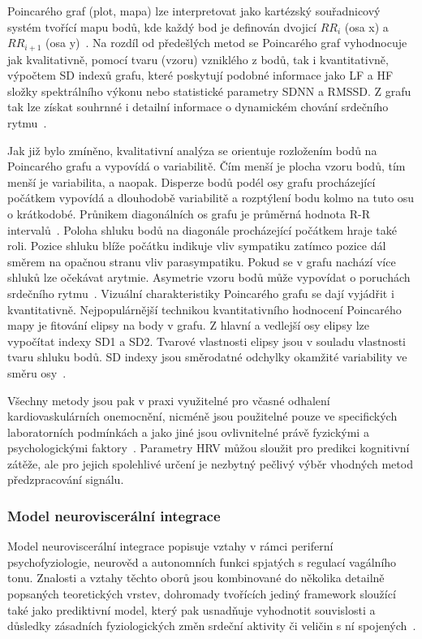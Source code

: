 Poincarého graf (plot, mapa) lze interpretovat jako kartézský souřadnicový systém
tvořící mapu bodů, kde každý bod je definován dvojicí $RR_i$ (osa x) a
$RR_{i+1}$ (osa y)~\cite{Hsu2012,Hejjel2001}. Na rozdíl od předešlých metod se
Poincarého graf vyhodnocuje jak kvalitativně, pomocí tvaru (vzoru) vzniklého z
bodů, tak i kvantitativně, výpočtem SD indexů grafu, které poskytují podobné
informace jako LF a HF složky spektrálního výkonu nebo statistické parametry
SDNN a RMSSD. Z grafu tak lze získat souhrnné i detailní informace o dynamickém
chování srdečního rytmu~\cite{Hsu2012,Kubickova2016}. 

Jak již bylo zmíněno, kvalitativní analýza se orientuje rozložením bodů na
Poincarého grafu a vypovídá o variabilitě. Čím menší je plocha vzoru bodů, tím
menší je variabilita, a naopak. Disperze bodů podél osy grafu procházející
počátkem vypovídá a dlouhodobě variabilitě a rozptýlení bodu kolmo na tuto osu o
krátkodobé. Průnikem diagonálních os grafu je průměrná hodnota R-R
intervalů~\cite{Hejjel2001}. Poloha shluku bodů na diagonále procházející
počátkem hraje také roli. Pozice shluku blíže počátku indikuje vliv sympatiku
zatímco pozice dál směrem na opačnou stranu vliv parasympatiku. Pokud se v grafu
nachází více shluků lze očekávat arytmie. Asymetrie vzoru bodů může vypovídat o
poruchách srdečního rytmu~\cite{Habib2013}. Vizuální charakteristiky Poincarého
grafu se dají vyjádřit i kvantitativně. Nejpopulárnější technikou
kvantitativního hodnocení Poincarého mapy je fitování elipsy na 
body v grafu. Z hlavní a vedlejší osy elipsy lze vypočítat indexy SD1 a SD2. Tvarové
vlastnosti elipsy jsou v souladu vlastnosti tvaru shluku bodů.
SD indexy jsou směrodatné odchylky okamžité variability ve směru
osy~\cite{Habib2013,Mazhar2007}.

Všechny metody jsou pak v praxi využitelné pro včasné odhalení
kardiovaskulárních onemocnění, nicméně jsou použitelné pouze ve specifických
laboratorních podmínkách a jako jiné jsou ovlivnitelné právě fyzickými a
psychologickými faktory~\cite{Habib2013,Kubickova2016}. Parametry HRV můžou
sloužit pro predikci kognitivní zátěže, ale pro jejich spolehlivé určení je
nezbytný pečlivý výběr vhodných metod předzpracování signálu.

\subsubsection{Model neuroviscerální integrace}
Model neuroviscerální integrace popisuje vztahy v rámci periferní
psychofyziologie, neurověd a autonomních funkci spjatých s regulací vagálního
tonu. Znalosti a vztahy těchto oborů jsou kombinované do několika detailně popsaných
teoretických vrstev, dohromady tvořících jediný framework sloužící také jako
prediktivní model, který pak usnadňuje vyhodnotit souvislosti a důsledky
zásadních fyziologických změn srdeční aktivity či veličin s ní
spojených~\cite{Smith2017}.

